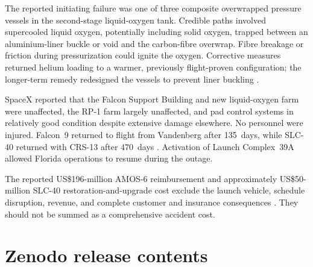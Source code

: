 \documentclass[]{seismica}
\begin{document}
The reported initiating failure was one of three composite overwrapped pressure
vessels in the second-stage liquid-oxygen tank. Credible paths involved
supercooled liquid oxygen, potentially including solid oxygen, trapped between
an aluminium-liner buckle or void and the carbon-fibre overwrap. Fibre breakage
or friction during pressurization could ignite the oxygen. Corrective measures
returned helium loading to a warmer, previously flight-proven configuration;
the longer-term remedy redesigned the vessels to prevent liner buckling
\citep{spacex_anomaly_2017}.

SpaceX reported that the Falcon Support Building and new liquid-oxygen farm
were unaffected, the RP-1 farm largely unaffected, and pad control systems in
relatively good condition despite extensive damage elsewhere. No personnel
were injured. Falcon~9 returned to flight from Vandenberg after 135~days, while
SLC-40 returned with CRS-13 after 470~days
\citep{spacex_iridium1_2017,spacex_crs13_2017}. Activation of Launch
Complex~39A allowed Florida operations to resume during the outage.

The reported US\$196-million AMOS-6 reimbursement and approximately
US\$50-million SLC-40 restoration-and-upgrade cost exclude the launch vehicle,
schedule disruption, revenue, and complete customer and insurance consequences
\citep{magan_amos6_2016,clark_slc40_2017}. They should not be summed as a
comprehensive accident cost.


\section*{Zenodo release contents}
\end{document}
